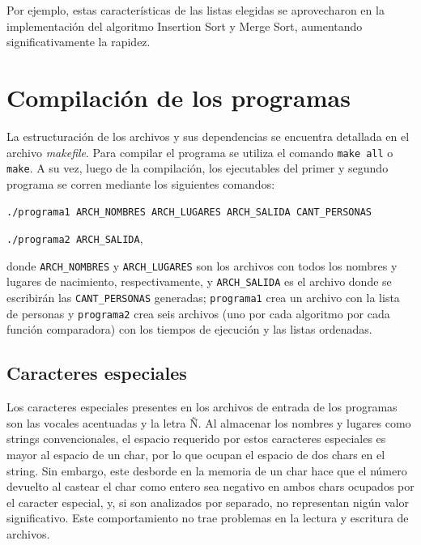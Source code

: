 \documentclass[11pt]{article}
\begin{document}
Por ejemplo, estas características de las listas elegidas se aprovecharon en la implementación del algoritmo Insertion Sort y Merge Sort, aumentando significativamente la rapidez.\par

\section{Compilación de los programas}

La estructuración de los archivos y sus dependencias se encuentra detallada en el archivo \textit{makefile}. Para compilar el programa se utiliza el comando \verb|make all| o \verb|make|. A su vez, luego de la compilación, los ejecutables del primer y segundo programa se corren mediante los siguientes comandos:\par

\noindent \verb|./programa1 ARCH_NOMBRES ARCH_LUGARES ARCH_SALIDA CANT_PERSONAS| \par
\noindent \verb|./programa2 ARCH_SALIDA|,\par

\noindent donde \verb|ARCH_NOMBRES| y \verb|ARCH_LUGARES| son los archivos con todos los nombres y lugares de nacimiento, respectivamente, y \verb|ARCH_SALIDA| es el archivo donde se escribirán las \verb|CANT_PERSONAS| generadas; \verb|programa1| crea un archivo con la lista de personas y \verb|programa2| crea seis archivos (uno por cada algoritmo por cada función comparadora) con los tiempos de ejecución y las listas ordenadas.\par

\subsection{Caracteres especiales}
\vspace{-.3cm}
Los caracteres especiales presentes en los archivos de entrada de los programas son las vocales acentuadas y la letra Ñ. Al almacenar los nombres y lugares como strings convencionales, el espacio requerido por estos caracteres especiales es mayor al espacio de un char, por lo que ocupan el espacio de dos chars en el string. Sin embargo, este desborde en la memoria de un char hace que el número devuelto al castear el char como entero sea negativo en ambos chars ocupados por el caracter especial, y, si son analizados por separado, no representan nigún valor significativo. Este comportamiento no trae problemas en la lectura y escritura de archivos.\par
\end{document}
